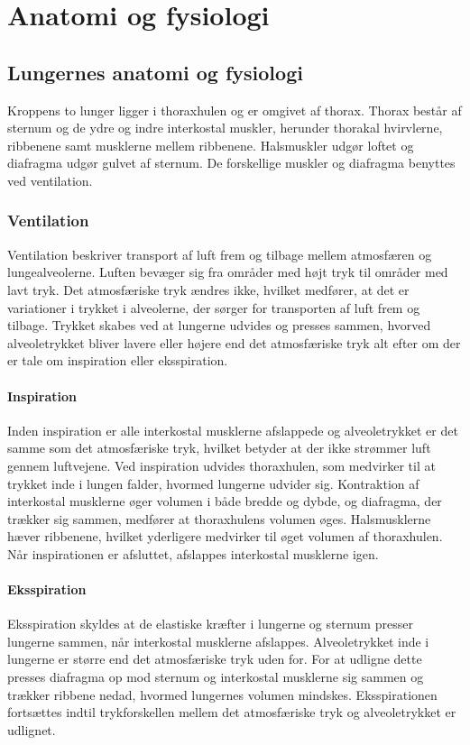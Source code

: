 \chapter{Anatomi og fysiologi}
\section{Lungernes anatomi og fysiologi}
Kroppens to lunger ligger i thoraxhulen og er omgivet af thorax. Thorax består af sternum og de ydre og indre interkostal muskler, herunder thorakal hvirvlerne, ribbenene samt musklerne mellem ribbenene. Halsmuskler udgør loftet og diafragma udgør gulvet af sternum. De forskellige muskler og diafragma benyttes ved ventilation.

\subsection{Ventilation}
Ventilation beskriver transport af luft frem og tilbage mellem atmosfæren og lungealveolerne. Luften bevæger sig fra områder med højt tryk til områder med lavt tryk. Det atmosfæriske tryk ændres ikke, hvilket medfører, at det er variationer i trykket i alveolerne, der sørger for transporten af luft frem og tilbage. Trykket skabes ved at lungerne udvides og presses sammen, hvorved alveoletrykket bliver lavere eller højere end det atmosfæriske tryk alt efter om der er tale om inspiration eller eksspiration. 

\subsubsection{Inspiration}
Inden inspiration er alle interkostal musklerne afslappede og alveoletrykket er det samme som det atmosfæriske tryk, hvilket betyder at der ikke strømmer luft gennem luftvejene. Ved inspiration udvides thoraxhulen, som medvirker til at trykket inde i lungen falder, hvormed lungerne udvider sig. Kontraktion af interkostal musklerne øger volumen i både bredde og dybde, og diafragma, der trækker sig sammen, medfører at thoraxhulens volumen øges. Halsmusklerne hæver ribbenene, hvilket yderligere medvirker til øget volumen af thoraxhulen. Når inspirationen er afsluttet, afslappes interkostal musklerne igen. 

\subsubsection{Eksspiration}
Eksspiration skyldes at de elastiske kræfter i lungerne og sternum presser lungerne sammen, når interkostal musklerne afslappes. Alveoletrykket inde i lungerne er større end det atmosfæriske tryk uden for. For at udligne dette presses diafragma op mod sternum og interkostal musklerne sig sammen og trækker ribbene nedad, hvormed lungernes volumen mindskes. Eksspirationen fortsættes indtil trykforskellen mellem det atmosfæriske tryk og alveoletrykket er udlignet.  

